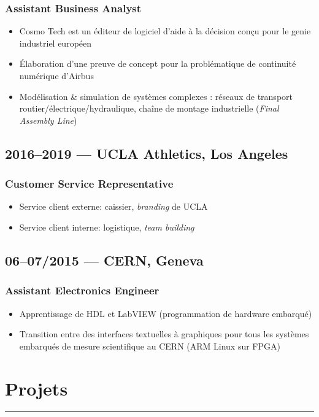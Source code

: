 \documentclass[10pt]{report}
\begin{document}
\subsubsection*{Assistant Business Analyst}
\begin{itemize}
    \item Cosmo Tech est un éditeur de logiciel d’aide à la décision conçu pour le genie industriel européen
    \item Élaboration d’une preuve de concept pour la problématique de continuité numérique d’Airbus
    \item Modélisation \& simulation de systèmes complexes : réseaux de transport routier/électrique/hydraulique, chaîne de montage industrielle (\textit{Final Assembly Line})
\end{itemize}
\subsection*{2016--2019 --- UCLA Athletics, Los Angeles}
\subsubsection*{Customer Service Representative}
\begin{itemize}
    \item Service client externe: caissier, \textit{branding} de UCLA
    \item Service client interne: logistique, \textit{team building}
\end{itemize}
\subsection*{06--07/2015 --- CERN, Geneva}
\subsubsection*{Assistant Electronics Engineer}
\begin{itemize}
    \item Apprentissage de HDL et LabVIEW (programmation de hardware embarqué)
    \item Transition entre des interfaces textuelles à graphiques pour tous les systèmes embarqués de mesure scientifique au CERN (ARM Linux sur FPGA)
\end{itemize}

\section*{Projets}
\rule{\linewidth}{1pt}\\
\end{document}
